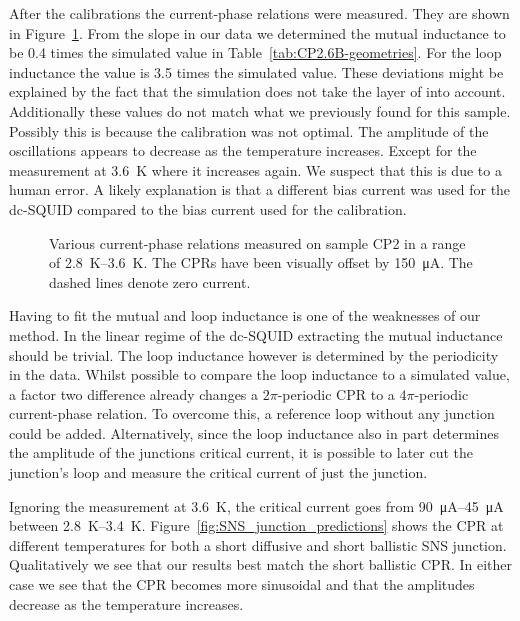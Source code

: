 After the calibrations the current-phase relations were measured. They are shown in Figure~\ref{fig:CP2.6B_revisited_CPRs}. From the slope in our data we determined the mutual inductance to be 0.4 times the simulated value in Table~\ref{tab:CP2.6B-geometries}. For the loop inductance the value is 3.5 times the simulated value. These deviations might be explained by the fact that the simulation does not take the layer of  into account. Additionally these values do not match what we previously found for this sample. Possibly this is because the calibration was not optimal. The amplitude of the oscillations appears to decrease as the temperature increases. Except for the measurement at \qty{3.6}{\kelvin} where it increases again. We suspect that this is due to a human error. A likely explanation is that a different bias current was used for the dc-SQUID compared to the bias current used for the calibration.

\begin{figure}[ht!]
	\centering
	
	\caption{Various current-phase relations measured on sample CP2 in a range of \qtyrange{2.8}{3.6}{\kelvin}. The CPRs have been visually offset by \qty{150}{\micro\ampere}. The dashed lines denote zero current.}
	\label{fig:CP2.6B_revisited_CPRs}
\end{figure}

Having to fit the mutual and loop inductance is one of the weaknesses of our method. In the linear regime of the dc-SQUID extracting the mutual inductance should be trivial. The loop inductance however is determined by the periodicity in the data. Whilst possible to compare the loop inductance to a simulated value, a factor two difference already changes a $2\pi$-periodic CPR to a $4\pi$-periodic current-phase relation. To overcome this, a reference loop without any junction could be added. Alternatively, since the loop inductance also in part determines the amplitude of the junctions critical current, it is possible to later cut the junction's loop and measure the critical current of just the junction.

Ignoring the measurement at \qty{3.6}{\kelvin}, the critical current goes from \qtyrange{90}{45}{\micro\ampere} between \qtyrange{2.8}{3.4}{\kelvin}. Figure~\ref{fig:SNS_junction_predictions} shows the CPR at different temperatures for both a short diffusive and short ballistic SNS junction. Qualitatively we see that our results best match the short ballistic CPR. In either case we see that the CPR becomes more sinusoidal and that the amplitudes decrease as the temperature increases.

